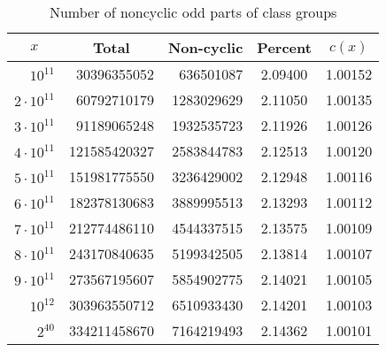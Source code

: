\documentclass{mcom-l}
\theoremstyle{definition}
\begin{document}
\begin{table}[htb]
\centering
\caption{Number of noncyclic odd parts of class groups}
\label{tab:CL_non_cyclic}
\begin{tabular}{| r || r | r | c | c |}
\hline
\multicolumn{1}{|c||}{$x$}	& \multicolumn{1}{c|}{Total}	& \multicolumn{1}{c|}{Non-cyclic}	& Percent	& $c(x)$\\
\hline
\hline
$10^{11}$	& 30396355052	& 636501087	& 2.09400	& 1.00152\\
\hline
$2\cdot 10^{11}$	& 60792710179	& 1283029629	& 2.11050	& 1.00135\\
\hline
$3\cdot 10^{11}$	& 91189065248	& 1932535723	& 2.11926	& 1.00126\\
\hline
$4\cdot 10^{11}$	& 121585420327	& 2583844783	& 2.12513	& 1.00120\\
\hline
$5\cdot 10^{11}$	& 151981775550	& 3236429002	& 2.12948	& 1.00116\\
\hline
$6\cdot 10^{11}$	& 182378130683	& 3889995513	& 2.13293	& 1.00112\\
\hline
$7\cdot 10^{11}$	& 212774486110	& 4544337515	& 2.13575	& 1.00109\\
\hline
$8\cdot 10^{11}$	& 243170840635	& 5199342505	& 2.13814	& 1.00107\\
\hline
$9\cdot 10^{11}$	& 273567195607	& 5854902775	& 2.14021	& 1.00105\\
\hline
$10^{12}$	& 303963550712	& 6510933430	& 2.14201	& 1.00103\\
\hline
$2^{40}$	& 334211458670	& 7164219493	& 2.14362	& 1.00101\\
\hline
\end{tabular}
\end{table}
\end{document}
